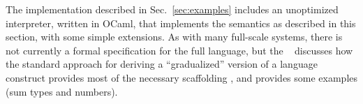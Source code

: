 The \Hazel implementation described in Sec.~\ref{sec:examples}
includes an unoptimized interpreter, written in OCaml, that implements the semantics as described
in this section, with some simple extensions. As with many full-scale systems, there is not currently a formal
specification for the full \Hazel language, but the \appendixName~
discusses how the standard approach for deriving a ``gradualized'' version of a
language construct provides most of the necessary scaffolding \cite{DBLP:conf/popl/CiminiS16}, and provides some examples (sum types and numbers).




